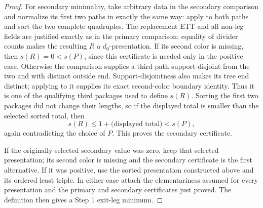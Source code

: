 \begin{proof}
For secondary minimality, take arbitrary data in the secondary
comparison and normalize its first two paths in exactly the same way:
apply  to both paths and sort
the two complete quadruples.  The replacement ETT and all non-leg fields
are justified exactly as in the primary comparison; equality of divider
counts makes the resulting
 $R$ a $d_0$-presentation.  If its
second color is missing, then $s(R)=0<s(P)$, since this certificate is
needed only in the positive case.  Otherwise the comparison supplies a
third path support-disjoint from the two and with distinct outside end.
Support-disjointness also makes its tree end distinct; applying
 to it supplies its exact
second-color boundary identity.  Thus it is one of the qualifying third
packages used to define $s(R)$.  Sorting the first two packages did not
change their lengths, so if the displayed total is smaller than the
selected sorted total, then
\[
 s(R)\leq 1+\text{(displayed total)}<s(P),
\]
again contradicting the choice of $P$.  This proves the secondary
certificate.

If the originally selected secondary value was zero, keep that selected
presentation; its second color is missing and the secondary certificate
is the first alternative.  If it was positive, use the sorted
presentation constructed above and its ordered least triple.  In either
case attach the elementariness assumed for every presentation and the
primary and secondary certificates just proved.  The definition
 then gives a Step 1 exit-leg minimum.
\end{proof}
